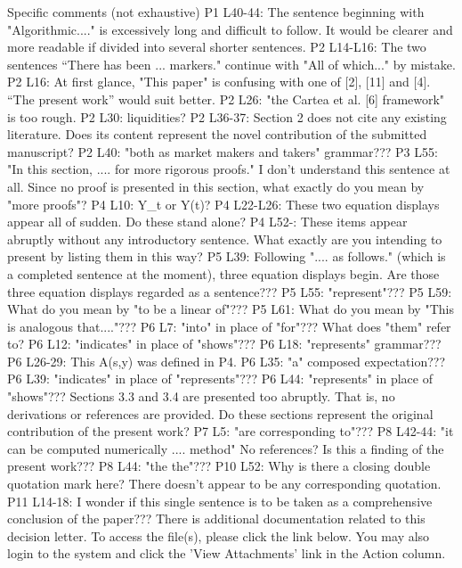 Specific comments (not exhaustive)
P1 L40-44: The sentence beginning with "Algorithmic...." is excessively long and difficult to follow. It would be clearer and more readable if divided into several shorter sentences.
P2 L14-L16: The two sentences ``There has been ... markers." continue with "All of which..." by mistake.
P2 L16: At first glance, "This paper" is confusing with one of [2], [11] and [4]. ``The present work'' would suit better.
P2 L26: "the Cartea et al. [6] framework" is too rough.
P2 L30: liquidities?
P2 L36-37: Section 2 does not cite any existing literature. Does its content represent the novel contribution of the submitted manuscript?
P2 L40: "both as market makers and takers" grammar???
P3 L55: "In this section, .... for more rigorous proofs." I don't understand this sentence at all. Since no proof is presented in this section, what exactly do you mean by "more proofs"?
P4 L10: Y_t or Y(t)?
P4 L22-L26: These two equation displays appear all of sudden. Do these stand alone?
P4 L52-: These items appear abruptly without any introductory sentence. What exactly are you intending to present by listing them in this way?
P5 L39: Following ".... as follows." (which is a completed sentence at the moment), three equation displays begin. Are those three equation displays regarded as a sentence???
P5 L55: "represent"???
P5 L59: What do you mean by "to be a linear of"???
P5 L61: What do you mean by "This is analogous that...."???
P6 L7: "into" in place of "for"??? What does "them" refer to?
P6 L12: "indicates" in place of "shows"???
P6 L18: "represents" grammar???
P6 L26-29: This A(s,y) was defined in P4.
P6 L35: "a" composed expectation???
P6 L39: "indicates" in place of "represents"???
P6 L44: "represents" in place of "shows"???
Sections 3.3 and 3.4 are presented too abruptly. That is, no derivations or references are provided. Do these sections represent the original contribution of the present work?
P7 L5: "are corresponding to"???
P8 L42-44: "it can be computed numerically .... method" No references? Is this a finding of the present work???
P8 L44: "the the"???
P10 L52: Why is there a closing double quotation mark here? There doesn't appear to be any corresponding quotation.
P11 L14-18: I wonder if this single sentence is to be taken as a comprehensive conclusion of the paper???
There is additional documentation related to this decision letter. To access the file(s), please click the link below. You may also login to the system and click the 'View Attachments' link in the Action column.